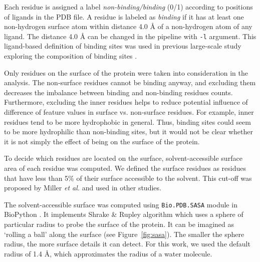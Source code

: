 Each residue is assigned a label \textit{non-binding/binding} (0/1) according to positions of ligands in the PDB file. A residue is labeled as \textit{binding} if it has at least one non-hydrogen surface atom within distance 4.0 {\AA} of a non-hydrogen atom of any ligand. The distance 4.0 {\AA} can be changed in the pipeline with \texttt{-l} argument. This ligand-based definition of binding sites was used in previous large-scale study exploring the composition of binding sites \cite{lbscomposition}.

Only residues on the surface of the protein were taken into consideration in the analysis. The non-surface residues cannot be binding anyway, and excluding them decreases the imbalance between binding and non-binding residues counts. Furthermore, excluding the inner residues helps to reduce potential influence of difference of feature values in surface vs. non-surface residues. For example, inner residues tend to be more hydrophobic in general. Thus, binding sites could seem to be more hydrophilic than non-binding sites, but it would not be clear whether it is not simply the effect of being on the surface of the protein.

To decide which residues are located on the surface, solvent-accessible surface area of each residue was computed. We defined the surface residues as residues that have less than 5\% of their surface accessible to the solvent. This cut-off was proposed by Miller \textit{et al.} \cite{sasaCutoff} and used in other studies\cite{jones,lbscomposition}. 

The solvent-accessible surface was computed using \texttt{Bio.PDB.SASA} module in BioPython \cite{sasa}. It implements Shrake \& Rupley algorithm \cite{shrake} which uses a sphere of particular radius to probe the surface of the protein. It can be imagined as `rolling a ball' along the surface (see Figure~\ref{fig:sasa}). The smaller the sphere radius, the more surface details it can detect. For this work, we used the default radius of 1.4 {\AA}, which approximates the radius of a water molecule.

